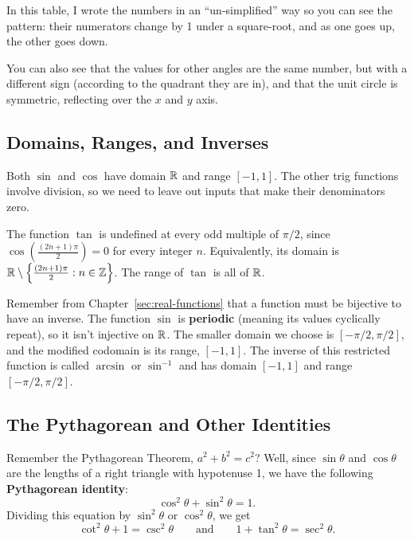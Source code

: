 In this table, I wrote the numbers in an ``un-simplified'' way so you can see the pattern: their numerators change by 1 under a square-root, and as one goes up, the other goes down.

You can also see that the values for other angles are the same number, but with a different sign (according to the quadrant they are in), and that the unit circle is symmetric, reflecting over the $x$ and $y$ axis.

\subsection{Domains, Ranges, and Inverses}

Both $\sin$ and $\cos$ have domain $\mathbb{R}$ and range $[-1,1]$. The other
trig functions involve division, so we need to leave out inputs that
make their denominators zero.

\begin{exampleblock}
The function $\tan$ is undefined at every odd multiple of $\pi/2$, since $\cos\left(\frac{(2n+1)\pi}{2}\right)=0$ for every integer $n$. Equivalently, its domain is $\mathbb{R}\setminus\left\{\frac{(2n+1)\pi}{2}:n\in\mathbb{Z}\right\}$. The range of $\tan$ is all of $\mathbb{R}$.
\end{exampleblock}

Remember from Chapter~\ref{sec:real-functions} that a function must be
bijective to have an inverse. The function $\sin$ is \textbf{periodic}
(meaning its values cyclically repeat), so it isn't injective on
$\mathbb{R}$. The smaller domain we choose is $[-\pi/2,\pi/2]$, and the
modified codomain is its range, $[-1,1]$. The inverse of this restricted
function is called $\arcsin$ or $\sin^{-1}$ and has domain $[-1,1]$
and range $[-\pi/2,\pi/2]$.

\subsection{The Pythagorean and Other Identities}

Remember the Pythagorean Theorem, $a^2 + b^2 = c^2$? Well, since $\sin\theta$ and $\cos\theta$ are the lengths of a right triangle with hypotenuse 1, we have the following \textbf{Pythagorean identity}:
$$\cos^2\theta +\sin^2\theta = 1.$$
Dividing this equation by $\sin^2\theta$ or $\cos^2\theta$, we get
$$\cot^2\theta + 1 = \csc^2\theta\quad\quad\text{and}\quad\quad 1+\tan^2\theta = \sec^2\theta.$$

